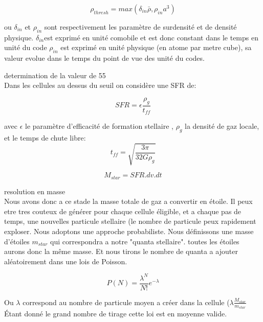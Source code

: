 \begin{equation}
	\rho_{thresh} = max\left(  \delta_{in} \bar{\rho}, \rho_{in} a^3 \right)
\end{equation} 

ou $\delta_{in}$ et $\rho_{in}$  sont respectivement les paramètre de surdensité et de densité physique.
$\delta_{in}$est exprimé en unité comobile et est donc constant dans le temps en unité du code
 $\rho_{in}$ est exprimé en unité physique (en atome par metre cube), sa valeur evolue dans le temps du point de vue des unité du codes.

determination de la valeur de 55\\ 
 
 
Dans les cellules au dessus du seuil on considère une SFR de:

\begin{equation}
	SFR = \epsilon \frac{\rho_g}{t_{ff}}
    \label{eq_sfr}
\end{equation}


avec  $\epsilon$ le paramètre d'efficacité de formation stellaire , $\rho_g$ la densité de gaz locale, et le temps de chute libre:
\begin{equation}
t_{ff} = \sqrt{\frac{3\pi}{32G\rho_g}}
\end{equation}

\begin{equation}
	M_{star} = SFR . dv .dt 
\end{equation}

resolution en masse\\

Nous avons donc a ce stade la masse totale de gaz a convertir en étoile.
Il peux etre tres couteux de générer pour chaque cellule éligible, et a chaque pas de temps, une nouvelles particule stellaire (le nombre de particule peux rapidement exploser.
Nous adoptons une approche probabiliste.
Nous définissons une masse d'étoiles $m_{star}$ qui correspondra a notre "quanta stellaire".
toutes les étoiles aurons donc la même masse.
Et nous tirons le nombre de quanta a ajouter aléatoirement dans une lois de Poisson.

\begin{equation}
	P(N) = \frac{\lambda^N}{N!} e^{-\lambda}
\end{equation}

Ou $\lambda$ correspond au nombre de particule moyen a créer dans la cellule ($\lambda \frac{ M_{star}}{m_{star}}$
Étant donné le grand nombre de tirage cette loi est en moyenne valide.

